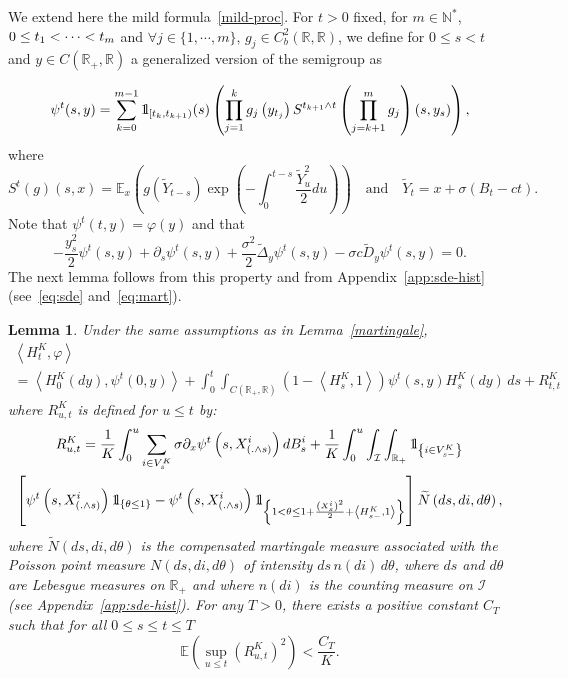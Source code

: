 \documentclass[10pt]{amsart}
\newtheorem{lemm}[theo]{Lemma}\newtheorem{prop}[theo]{Proposition}\newtheorem{coro}[theo]{Corollary}\newtheorem{conj}[theo]{Conjecture}
\theoremstyle{definition}\newtheorem{defi}[theo]{Definition}\newtheorem{rema}[theo]{Remark}\newtheorem{exam}[theo]{Example}\newtheorem{exem}[theo]{Example}\newtheorem{nota}[theo]{Notation}
\newcommand{\Io}{\mathcal{I}}
\newcommand*\N{\mathbb{N}}
\newcommand*\R{\mathbb{R}}
\newcommand*\E{\mathbb{E}}
\newcommand*\ind{{\mathchoice {\rm 1\mskip-4mu l} {\rm 1\mskip-4mu l} {\rm 1\mskip-4.5mu l} {\rm 1\mskip-5mu l}}}
\let\oldtilde\tilde
\renewcommand*{\tilde}[1]{\mathchoice{\widetilde{#1}}{\widetilde{#1}}{\oldtilde{#1}}{\oldtilde{#1}}}
\let\oldforall\forall
\renewcommand*{\forall}{\mathrel{\oldforall}}
\begin{document}
We extend here the mild formula~\eqref{mild-proc}. For $t>0$ fixed, for $m\in \N^*$, $0\le t_{1}<\cdots\linebreak<t_{m}$ and $\forall j \in \{1,\cdots,m\}$, $g_{j}\in C_{b}^2(\R, \R)$, we define for $0\le s< t$ and $y\in C(\R_+,\R)$ a generalized version of the semigroup as

\begin{equation}
\psi^t(s,y) = \sum_{k=0}^{m-1}\ind_{\left[t_k, t_{k+1}\right)}(s)\left(\prod_{j=1}^k g_j\left(y_{t_j}\right) S^{t_{k+1} \wedge t}\left(\prod_{j=k+1}^m g_j\right)(s,y_s)\right),
\end{equation}
where
\[
S^t(g)(s,x)= \E_{x}\left(g\left(\widetilde{Y}_{t-s}\right)\exp\left(-\int_{0}^{t-s} \frac{\widetilde{Y}_{u}^2}{2}du\right)\right)\quad\text{and}\quad\widetilde{Y}_{t}= x+\sigma\left(B_{t}-ct\right).
\]
Note that $\psi^t(t,y)=\varphi(y)$ and that
\[
-\frac{y_{s}^2}{2} \psi^t(s,y)+ \partial_s \psi^t(s,y)+ \frac{\sigma^2}{2} \widetilde{\Delta}_y\psi^t(s,y)-\sigma c \widetilde{D}_y\psi^t(s,y)=0.
\]
The next lemma follows from this property and from Appendix~\ref{app:sde-hist} (see~\eqref{eq:sde} and~\eqref{eq:mart}).

\begin{lemm}
Under the same assumptions as in Lemma~\ref{martingale},
\begin{multline}\label{martingale:mild}
\left\langle H^K_t,\varphi\right\rangle\\
= \left\langle H^K_0(dy),\psi^t(0,y)\right\rangle + \int_0^t \int_{C\left(\R_+, \R\right)} \left(1 - \left\langle H^K_s,1\right\rangle\right)\psi^t(s,y) H^K_s(dy)\, ds+ R_{t, t}^{K}
\end{multline}
where $R^K_{u, t}$ is defined for $u\leq t$ by:
\begin{multline}\label{def:Rut}
R^K_{u, t}
= \frac{1}{K} \int_0^u \sum_{i \in V^K_{s}} \sigma \partial_x \psi^t\left(s,X^i_{\left(.\wedge s\right)}\right) dB^i_s
+ \frac{1}{K}\int_0^u \int_{\Io}\int_{\R_+}\ind_{\left\{i \in V^K_{s-}\right\}}\\
\left[\psi^t\left(s,X^i_{\left(.\wedge s\right)}\right)\ind_{\left\{\theta \leq 1\right\}} 
 -\psi^t\left(s,X^i_{\left(.\wedge s\right)}\right) \ind_{\left\{1 < \theta \leq 1+ \frac{\left(X^i_{s}\right)^2}{2}+\left\langle H_{s-}^{K}, 1\right\rangle\right\}} \right] \tilde N\left(ds, di, d\theta\right),
\end{multline}
where $\widetilde{N}(ds,di,d\theta)$ is the compensated martingale measure associated with the Poisson point measure $N(ds,di,d\theta)$ of intensity  $ds\, n(di)\, d\theta$, where $ds$ and $d\theta$ are Lebesgue measures on $\mathbb{R}_+$ and where $n(di)$ is the counting measure on $\mathcal{I}$ (see Appendix~\ref{app:sde-hist}). For any $T>0$, there exists a positive constant $C_{T}$ such that for all $0\leq s\leq t\leq T$
\begin{equation}\label{estimee:R}
\E\left(\sup_{u \le t}\left(R^K_{u, t}\right)^2\right) < \frac{C_{T}}{K}.
\end{equation}
\end{lemm}
\end{document}

